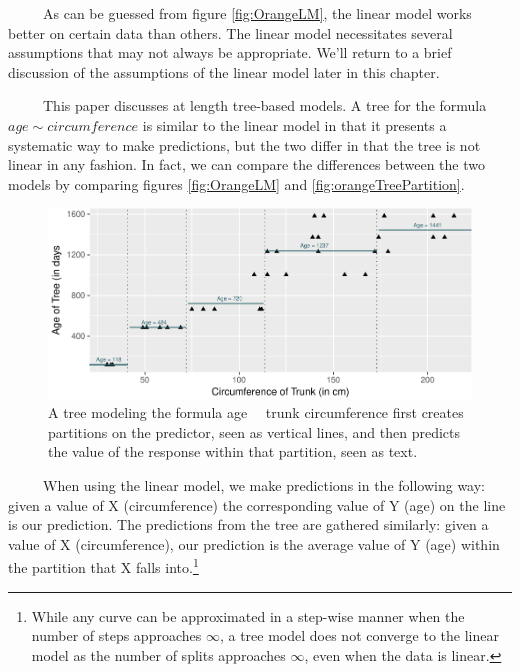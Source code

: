 \documentclass[12pt,twoside]{reedthesis}
\begin{document}
  ~~~~~As can be guessed from figure \ref{fig:OrangeLM}, the linear model
  works better on certain data than others. The linear model necessitates
  several assumptions that may not always be appropriate. We'll return to
  a brief discussion of the assumptions of the linear model later in this
  chapter.
  
  ~~~~~This paper discusses at length tree-based models. A tree for the
  formula \(age \sim circumference\) is similar to the linear model in
  that it presents a systematic way to make predictions, but the two
  differ in that the tree is not linear in any fashion. In fact, we can
  compare the differences between the two models by comparing figures
  \ref{fig:OrangeLM} and \ref{fig:orangeTreePartition}.
  
  \begin{figure}[H]
  
  {\centering \includegraphics{Thesis_files/figure-latex/unnamed-chunk-5-1} 
  
  }
  
  \caption{\label{fig:orangeTreePartition}A tree modeling the formula age  \ \  trunk circumference first creates partitions on the predictor, seen as vertical lines, and then predicts the value of the response within that partition, seen as text.}\label{fig:unnamed-chunk-5}
  \end{figure}
  
  ~~~~~When using the linear model, we make predictions in the following
  way: given a value of X (circumference) the corresponding value of Y
  (age) on the line is our prediction. The predictions from the tree are
  gathered similarly: given a value of X (circumference), our prediction
  is the average value of Y (age) within the partition that X falls
  into.\footnote{While any curve can be approximated in a step-wise manner
    when the number of steps approaches \(\infty\), a tree model does not
    converge to the linear model as the number of splits approaches
    \(\infty\), even when the data is linear.}
  
\end{document}
